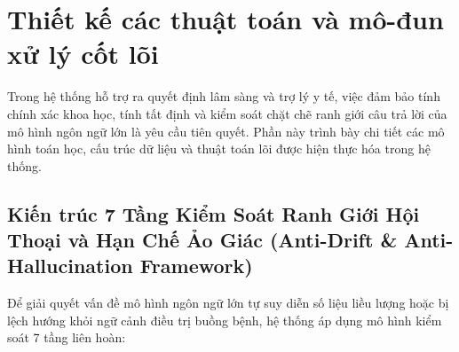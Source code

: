 \section{Thiết kế các thuật toán và mô-đun xử lý cốt lõi}
\label{sec:core_algorithms}

Trong hệ thống hỗ trợ ra quyết định lâm sàng và trợ lý y tế, việc đảm bảo tính chính xác khoa học, tính tất định và kiểm soát chặt chẽ ranh giới câu trả lời của mô hình ngôn ngữ lớn là yêu cầu tiên quyết. Phần này trình bày chi tiết các mô hình toán học, cấu trúc dữ liệu và thuật toán lõi được hiện thực hóa trong hệ thống.

\subsection{Kiến trúc 7 Tầng Kiểm Soát Ranh Giới Hội Thoại và Hạn Chế Ảo Giác (Anti-Drift \& Anti-Hallucination Framework)}
\label{subsec:anti_hallucination_framework}

Để giải quyết vấn đề mô hình ngôn ngữ lớn tự suy diễn số liệu liều lượng hoặc bị lệch hướng khỏi ngữ cảnh điều trị buồng bệnh, hệ thống áp dụng mô hình kiểm soát 7 tầng liên hoàn:

